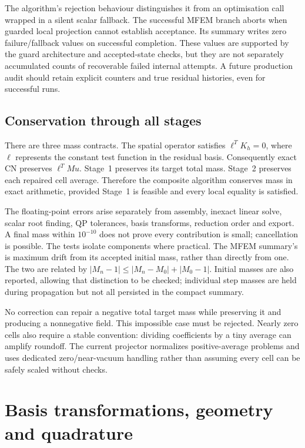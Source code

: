 The algorithm's rejection behaviour distinguishes it from an optimisation call wrapped in a silent scalar fallback. The successful MFEM branch aborts when guarded local projection cannot establish acceptance. Its summary writes zero failure/fallback values on successful completion. These values are supported by the guard architecture and accepted-state checks, but they are not separately accumulated counts of recoverable failed internal attempts. A future production audit should retain explicit counters and true residual histories, even for successful runs.

\section{Conservation through all stages}
There are three mass contracts. The spatial operator satisfies $\ell^TK_h=0$, where $\ell$ represents the constant test function in the residual basis. Consequently exact CN preserves $\ell^TMu$. Stage~1 preserves its target total mass. Stage~2 preserves each repaired cell average. Therefore the composite algorithm conserves mass in exact arithmetic, provided Stage~1 is feasible and every local equality is satisfied.

The floating-point errors arise separately from assembly, inexact linear solve, scalar root finding, QP tolerances, basis transforms, reduction order and export. A final mass within $10^{-10}$ does not prove every contribution is small; cancellation is possible. The tests isolate components where practical. The MFEM summary's  is maximum drift from its accepted initial mass, rather than directly from one. The two are related by $|M_n-1|\le|M_n-M_0|+|M_0-1|$. Initial masses are also reported, allowing that distinction to be checked; individual step masses are held during propagation but not all persisted in the compact summary.

No correction can repair a negative total target mass while preserving it and producing a nonnegative field. This impossible case must be rejected. Nearly zero cells also require a stable convention: dividing coefficients by a tiny average can amplify roundoff. The current projector normalizes positive-average problems and uses dedicated zero/near-vacuum handling rather than assuming every cell can be safely scaled without checks.

\chapter{Basis transformations, geometry and quadrature}
